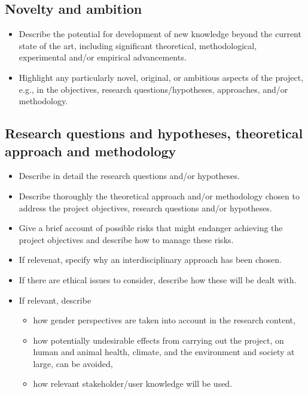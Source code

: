 \documentclass[11pt,a4paper,british]{article}
\begin{document}
\subsection{Novelty and ambition}
\begin{itemize}
    \item Describe the potential for development of new knowledge beyond the
        current state of the art, including significant theoretical,
        methodological, experimental and/or empirical advancements.
    \item Highlight any particularly novel, original, or ambitious aspects of
        the project, e.g., in the objectives, research questions/hypotheses,
        approaches, and/or methodology.
\end{itemize}

\subsection{Research questions and hypotheses, theoretical approach and methodology}
\begin{itemize}
    \item Describe in detail the research questions and/or hypotheses.
    \item Describe thoroughly the theoretical approach and/or methodology
        chosen to address the project objectives, research questions and/or
        hypotheses.
    \item Give a brief account of possible risks that might endanger achieving
        the project objectives and describe how to manage these risks.
    \item If relevenat, specify why an interdisciplinary approach has been
        chosen.
    \item If there are ethical issues to consider, describe how these will be
        dealt with.
    \item If relevant, describe
        \begin{itemize}
            \item how gender perspectives are taken into account in the
                research content,
            \item how potentially undesirable effects from carrying out the
                project, on human and animal health, climate, and the environment
                and society at large, can be avoided,
            \item how relevant stakeholder/user knowledge will be used.
        \end{itemize}
\end{itemize}
\end{document}

